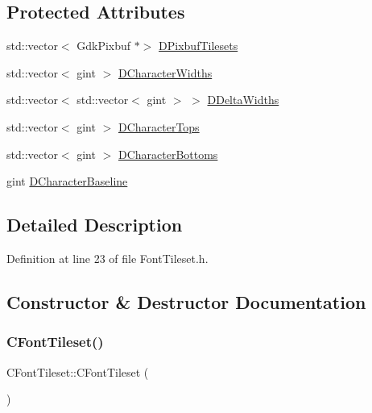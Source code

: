 \subsection*{Protected Attributes}
\begin{DoxyCompactItemize}
\item 
std\+::vector$<$ Gdk\+Pixbuf $\ast$$>$ \hyperlink{classCFontTileset_ae6e92dd613809fb15892b51e0e6b4940}{D\+Pixbuf\+Tilesets}
\item 
std\+::vector$<$ gint $>$ \hyperlink{classCFontTileset_ad25347b5350a8380be8c550d9f2e2798}{D\+Character\+Widths}
\item 
std\+::vector$<$ std\+::vector$<$ gint $>$ $>$ \hyperlink{classCFontTileset_a1e253853e14282e9582a7f47dace8f70}{D\+Delta\+Widths}
\item 
std\+::vector$<$ gint $>$ \hyperlink{classCFontTileset_aa009ebe41a491d854a5f6005919649c2}{D\+Character\+Tops}
\item 
std\+::vector$<$ gint $>$ \hyperlink{classCFontTileset_a13d7063022d59bf3347452c78be50a8b}{D\+Character\+Bottoms}
\item 
gint \hyperlink{classCFontTileset_aba19d07744c08aeb957728067c52466c}{D\+Character\+Baseline}
\end{DoxyCompactItemize}


\subsection{Detailed Description}


Definition at line 23 of file Font\+Tileset.\+h.



\subsection{Constructor \& Destructor Documentation}
\hypertarget{classCFontTileset_a28d6cb7e16b6dcd4d6572dddd4d59014}{}\label{classCFontTileset_a28d6cb7e16b6dcd4d6572dddd4d59014} 
\subsubsection{\texorpdfstring{C\+Font\+Tileset()}{CFontTileset()}}
{\footnotesize\ttfamily C\+Font\+Tileset\+::\+C\+Font\+Tileset (\begin{DoxyParamCaption}{ }\end{DoxyParamCaption})}



